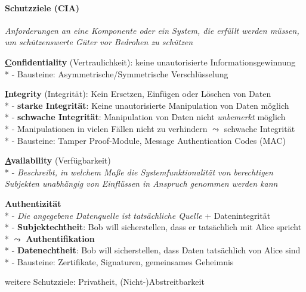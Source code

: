 \paragraph{Schutzziele (CIA)}
\begin{items}
  \item \emph{Anforderungen an eine Komponente oder ein System, die erfüllt werden müssen, um schützenswerte Güter vor Bedrohen zu schützen}
  
  \medskip
  \item \textbf{\underline{C}onfidentiality} (Vertraulichkeit): keine unautorisierte Informationsgewinnung\\*
  	- Bausteine: Asymmetrische/Symmetrische Verschlüsselung
  	
  	\medskip
  \item \textbf{\underline{I}ntegrity} (Integrität): Kein Ersetzen, Einfügen oder Löschen von Daten \\*
  	- \textbf{starke Integrität}: Keine unautorisierte Manipulation von Daten möglich\\*
	- \textbf{schwache Integrität}: Manipulation von Daten nicht \emph{unbemerkt} möglich\\*
	- Manipulationen in vielen Fällen nicht zu verhindern \( \leadsto \) schwache Integrität\\*
  	- Bausteine: Tamper Proof-Module, Message Authentication Codes (MAC)
   
   \medskip
   \item \textbf{\underline{A}vailability} (Verfügbarkeit)\\*
     - \emph{Beschreibt, in welchem Maße die Systemfunktionalität von berechtigen Subjekten unabhängig von Einflüssen in Anspruch genommen werden kann}
   
   \medskip
   \item \textbf{Authentizität}\\*
     - \emph{Die angegebene Datenquelle ist tatsächliche Quelle} + Datenintegrität\\*
     - \textbf{Subjektechtheit}: Bob will sicherstellen, dass er tatsächlich mit Alice spricht \\* \( \leadsto \) \textbf{Authentifikation}\\*
     - \textbf{Datenechtheit}: Bob will sicherstellen, dass Daten tatsächlich von Alice sind\\*
     - Bausteine: Zertifikate, Signaturen, gemeinsames Geheimnis
     
     \medskip
  \item weitere Schutzziele: Privatheit, (Nicht-)Abstreitbarkeit
\end{items}

